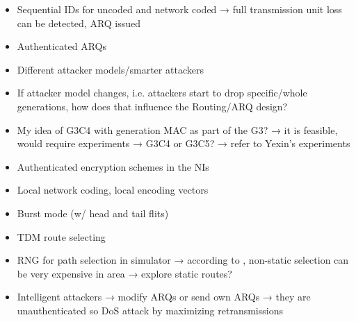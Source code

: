 \begin{itemize}
    \item Sequential IDs for uncoded and network coded → full transmission unit loss can be detected, ARQ issued
    \item Authenticated ARQs
    \item Different attacker models/smarter attackers
    \item If attacker model changes, i.e. attackers start to drop specific/whole generations,
        how does that influence the Routing/ARQ design?
    \item My idea of G3C4 with generation MAC as part of the G3? → it is feasible, would require experiments → G3C4 or G3C5? → refer to Yexin's
        experiments
    \item Authenticated encryption schemes in the NIs
    \item Local network coding, local encoding vectors
    \item Burst mode (w/ head and tail flits)
    \item TDM route selecting
    \item RNG for path selection in simulator → according to \cite{stefan11enhancingnocs}, non-static selection can be very expensive in area →
        explore static routes?
    \item Intelligent attackers → modify ARQs or send own ARQs → they are unauthenticated so DoS attack by maximizing retransmissions
\end{itemize}
